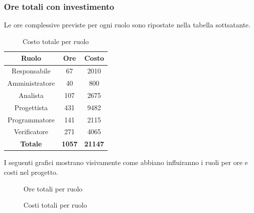 \subsubsection{Ore totali con investimento}
Le ore complessive previste per ogni ruolo sono ripostate nella tabella sottsatante.
\begin{table}[H]
	\centering
	\begin{tabular}{|c|c|c|}
		\hline
		\textbf{Ruolo} &
		\textbf{Ore} &
		\textbf{Costo} \\
		\hline
		Responsabile & 67 & 2010\\
		\hline
		Amministratore & 40 & 800\\
		\hline
		Analista & 107 & 2675\\
		\hline
		Progettista & 431 & 9482 \\
		\hline
		Programmatore & 141 & 2115 \\
		\hline
		Verificatore & 271 & 4065\\
		\hline
		\textbf{Totale} & \textbf{1057} & \textbf{21147} \\
		\hline
	\end{tabular}
	\caption{Costo totale per ruolo}
\end{table}
I seguenti grafici mostrano visivamente come abbiano influiranno i ruoli per ore e costi nel progetto.
\begin{figure}[H]
	\centering
	\caption{Ore totali per ruolo}
\end{figure}
\begin{figure}[H]
	\centering
	\caption{Costi totali per ruolo}
\end{figure}


